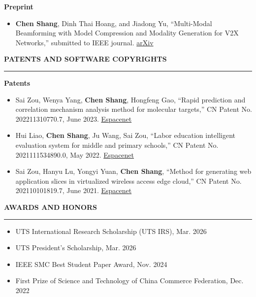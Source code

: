 \documentclass[10pt,a4paper]{article}
\newcommand{\sectionrule}[1]{
  \vspace{0.55em}
  {\large\bfseries #1\par}
  \vspace{0.20em}
  \hrule
  \vspace{0.45em}
}
\newcommand{\pubitem}[1]{
  \item #1
}
\begin{document}
\textbf{Preprint}
\begin{itemize}
  \pubitem{\textbf{Chen Shang}, Dinh Thai Hoang, and Jiadong Yu, ``Multi-Modal Beamforming with Model Compression and Modality Generation for V2X Networks,'' submitted to IEEE journal. \href{https://arxiv.org/abs/2506.22469}{arXiv}}
\end{itemize}

\sectionrule{PATENTS AND SOFTWARE COPYRIGHTS}
\textbf{Patents}
\begin{itemize}
  \pubitem{Sai Zou, Wenya Yang, \textbf{Chen Shang}, Hongfeng Gao, ``Rapid prediction and correlation mechanism analysis method for molecular targets,'' CN Patent No. 202211310770.7, June 2023. \href{https://worldwide.espacenet.com/patent/search/family/084906121/publication/CN115631808A?q=CN115631808A}{Espacenet}}
  \pubitem{Hui Liao, \textbf{Chen Shang}, Ju Wang, Sai Zou, ``Labor education intelligent evaluation system for middle and primary schools,'' CN Patent No. 2021111534890.0, May 2022. \href{https://worldwide.espacenet.com/patent/search/family/081494856/publication/CN114493094A?q=CN114493094A}{Espacenet}}
  \pubitem{Sai Zou, Hanyu Lu, Yongyi Yuan, \textbf{Chen Shang}, ``Method for generating web application slices in virtualized wireless access edge cloud,'' CN Patent No. 202110101819.7, June 2021. \href{https://worldwide.espacenet.com/patent/search/family/076051860/publication/CN112887142A?q=CN112887142A}{Espacenet}}
\end{itemize}


\sectionrule{AWARDS AND HONORS}
\begin{itemize}
  \item UTS International Research Scholarship (UTS IRS), Mar. 2026
  \item UTS President's Scholarship, Mar. 2026
  \item IEEE SMC Best Student Paper Award, Nov. 2024
  \item First Prize of Science and Technology of China Commerce Federation, Dec. 2022
\end{itemize}
\end{document}
